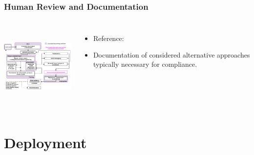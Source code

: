 \documentclass[11pt,
               aspectratio=169,
               hyperref={colorlinks}
               ]{beamer}
\begin{document}
		\begin{frame}
		
			\frametitle{Human Review and Documentation}		
			
			\begin{columns}
	
				\centering
				\includegraphics[height=120pt]{img/hr.png}
				
				\vspace{-5pt}
				\begin{itemize}
					\item Reference: 
					\item Documentation of considered alternative approaches typically necessary for compliance.
				\end{itemize}
				
			\end{columns}
		
		\end{frame}

	\section{Deployment}
\end{document}
